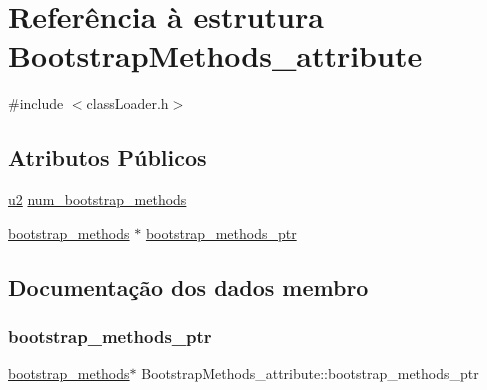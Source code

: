 \hypertarget{struct_bootstrap_methods__attribute}{}\section{Referência à estrutura Bootstrap\+Methods\+\_\+attribute}
\label{struct_bootstrap_methods__attribute}


{\ttfamily \#include $<$class\+Loader.\+h$>$}

\subsection*{Atributos Públicos}
\begin{DoxyCompactItemize}
\item 
\hyperlink{util_8h_a55ef8d87fd202b8417704c089899c5b9}{u2} \hyperlink{struct_bootstrap_methods__attribute_a4e8f99df950a9adb887c2039a600045b}{num\+\_\+bootstrap\+\_\+methods}
\item 
\hyperlink{structbootstrap__methods}{bootstrap\+\_\+methods} $\ast$ \hyperlink{struct_bootstrap_methods__attribute_afccff6225c86f55faeae52dcb48a6ff9}{bootstrap\+\_\+methods\+\_\+ptr}
\end{DoxyCompactItemize}


\subsection{Documentação dos dados membro}
\mbox{\label{struct_bootstrap_methods__attribute_afccff6225c86f55faeae52dcb48a6ff9}} 
\subsubsection{\texorpdfstring{bootstrap\+\_\+methods\+\_\+ptr}{bootstrap\_methods\_ptr}}
{\footnotesize\ttfamily \hyperlink{structbootstrap__methods}{bootstrap\+\_\+methods}$\ast$ Bootstrap\+Methods\+\_\+attribute\+::bootstrap\+\_\+methods\+\_\+ptr}

\mbox{\label{struct_bootstrap_methods__attribute_a4e8f99df950a9adb887c2039a600045b}} 
